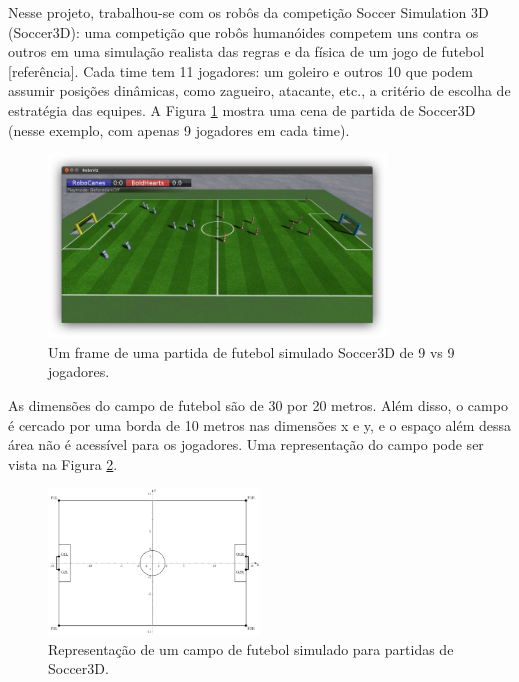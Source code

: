 \documentclass[a4paper,12pt]{article}
\begin{document}
Nesse projeto, trabalhou-se com os robôs da competição Soccer Simulation 3D (Soccer3D): uma competição que robôs humanóides competem uns contra os outros em uma simulação realista das regras e da física de um jogo de futebol [referência]. Cada time tem 11 jogadores: um goleiro e outros 10 que podem assumir posições dinâmicas, como zagueiro, atacante, etc., a critério de escolha de estratégia das equipes. A Figura \ref{fig:soccer3d-play} mostra uma cena de partida de Soccer3D (nesse exemplo, com apenas 9 jogadores em cada time).

\begin{figure}[H]
	\centering
	\includegraphics[width=0.8\textwidth]{figures/soccer3d-play.png}
   \caption{Um frame de uma partida de futebol simulado Soccer3D de 9 vs 9 jogadores.} \label{fig:soccer3d-play}
\end{figure}

As dimensões do campo de futebol são de 30 por 20 metros. Além disso, o campo é cercado por uma borda de 10 metros nas dimensões x e y, e o espaço além dessa área não é acessível para os jogadores. Uma representação do campo pode ser vista na Figura \ref{fig:soccer3d_field}.

\begin{figure}[H]
	\centering
	\includegraphics[width=0.5\textwidth]{figures/soccer3d-field.png}
   \caption{Representação de um campo de futebol simulado para partidas de Soccer3D.} \label{fig:soccer3d_field}
\end{figure}
\end{document}
